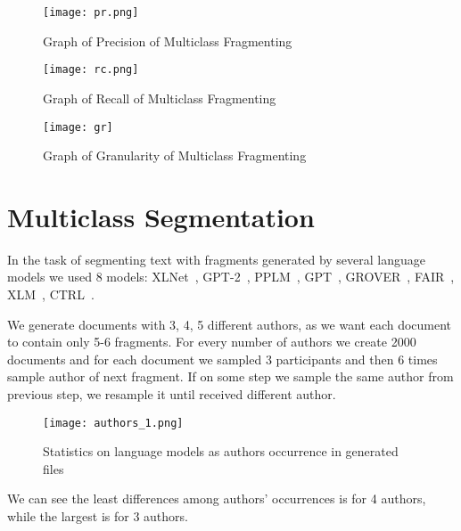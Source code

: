 \documentclass{article}
\begin{document}
\begin{figure}[bhtp]
	\texttt{[image: pr.png]}
	\caption{Graph of Precision of Multiclass Fragmenting}
	\label{fig:3}
\end{figure}

\begin{figure}[bhtp]
	\texttt{[image: rc.png]}
	\caption{Graph of Recall of Multiclass Fragmenting}
	\label{fig:4}
\end{figure}

\begin{figure}[bhtp]
	\texttt{[image: gr]}
	\caption{Graph of Granularity of Multiclass Fragmenting}
	\label{fig:5}
\end{figure}




\clearpage



\newpage
\appendix
\section{Multiclass Segmentation}

In the task of segmenting text with fragments generated by several language models we used 8 models: XLNet~\cite{xlnet}, GPT-2~\cite{gpt2}, PPLM~\cite{pplm}, GPT~\cite{gpt}, GROVER~\cite{grover}, FAIR~\cite{FAIR}, XLM~\cite{xlm}, CTRL~\cite{ctrl}.

We generate  documents with 3, 4, 5 different authors, as we want each document to contain only 5-6 fragments. For every number of authors we create 2000 documents and for each document we sampled 3 participants and then 6 times sample author of next fragment. If on some step we sample the same author from previous step, we resample it until received different author. 

\begin{figure}[bhtp]
	\texttt{[image: authors\_1.png]}
	\caption{Statistics on language models as authors occurrence in generated files}
	\label{fig:6}
\end{figure}

We can see the least differences among authors' occurrences is for 4 authors, while the largest is for 3 authors.
\end{document}
